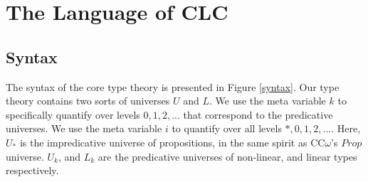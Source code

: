 \documentclass{article}
\theoremstyle{definition}
\begin{document}
  \section{The Language of CLC}
  \subsection{Syntax}
  The syntax of the core type theory is presented in Figure \ref{syntax}. Our type theory contains two sorts of universes $U$ and $L$. We use the meta variable $k$ to specifically quantify over levels $0, 1, 2, ...$ that correspond to the predicative universes. We use the meta variable $i$ to quantify over all levels $*, 0, 1, 2, ...$. Here, $U_*$ is the impredicative universe of propositions, in the same spirit as CC$\omega$'s $Prop$ universe. $U_k$, and $L_k$ are the predicative universes of non-linear, and linear types respectively.
\end{document}
